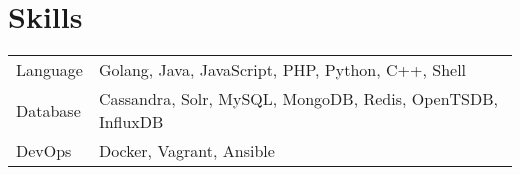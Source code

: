 \documentclass[11pt, letterpaper]{simple-cv}
\begin{document}
\section{Skills}
\begin{tabular}{ l l }
 Language &  Golang, Java, JavaScript, PHP, Python, C++, Shell\\
 Database & Cassandra, Solr, MySQL, MongoDB, Redis, OpenTSDB, InfluxDB\\
 DevOps & Docker, Vagrant, Ansible\\
\end{tabular}



\end{document}
